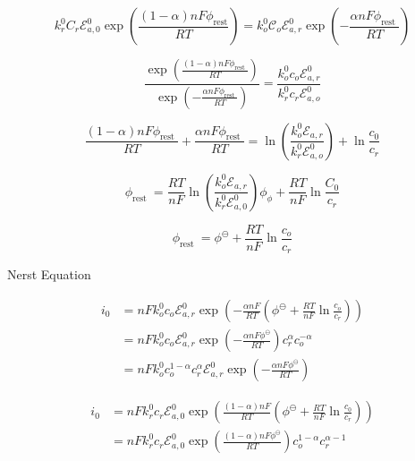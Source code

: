 \documentclass[lettersize,journal]{IEEEtran}
\begin{document}
\begin{equation}
  k_{r}^{0} C_{r} \mathscr{E}_{a, 0}^{0} \exp \left(\frac{(1-\alpha) n F \phi_{\text {rest}}}{R T}\right) =k_{o}^{0} \mathcal{C}_{o} \mathscr{E}_{a, r}^{0} \exp \left(-\frac{\alpha n F \phi_{\text {rest }}}{R T}\right)
\end{equation}


\begin{equation}
  \frac{\exp \left(\frac{(1-\alpha) n F \phi_{\text {rest }}}{R T}\right)}{\exp \left(-\frac{\alpha n F \phi_{\text {rest }}}{R T}\right)} =\frac{k_{o}^{0} c_{o} \mathscr{E}_{a, r}^{0}}{k_{r}^{0} c_{r} \mathscr{E}_{a, o}^{0}}
\end{equation}


\begin{equation}
  \frac{(1-\alpha) n F \phi_{\text {rest }}}{R T}+\frac{\alpha n F \phi_{\text {rest }}}{R T} =\ln \left(\frac{k_{o}^{0} \mathscr{E}_{a, r}}{k_{r}^{0} \mathscr{E}_{a, o}^{0}}\right)+\ln \frac{c_{0}}{c_{r}}
\end{equation}


\begin{equation}
  \phi_{\text {rest }} =\frac{R T}{n F} \ln \left(\frac{k_{o}^{0} \mathscr{E}_{a, r}}{k_{r}^{0} \mathscr{E}_{a, 0}^{0}}\right){\phi_{\phi}+\frac{R T}{n F} \ln \frac{C_{0}}{c_{r}}}
\end{equation}

\begin{equation}
\phi_{\text {rest }} =\phi^{\ominus}+\frac{R T}{n F} \ln \frac{c_{o}}{c_{r}}
\end{equation}

\noindent Nerst Equation

\begin{equation}
\begin{aligned}
i_{0} &=n F k_{o}^{0} c_{o} \mathscr{E}_{a, r}^{0} \exp \left(-\frac{\alpha n F}{R T}\left(\phi^{\ominus}+\frac{R T}{n F} \ln \frac{c_{o}}{c_{r}}\right)\right) \\
&=n F k_{o}^{0} c_{o} \mathscr{E}_{a, r}^{0} \exp \left(-\frac{\alpha n F \phi^{\ominus}}{R T}\right) c_{r}^{\alpha} c_{o}^{-\alpha} \\
&=n F k_{o}^{0} c_{o}^{1-\alpha} c_{r}^{\alpha} \mathscr{E}_{a, r}^{0} \exp \left(-\frac{\alpha n F \phi^{\ominus}}{R T}\right)
\end{aligned}
\end{equation}

\begin{equation}
\begin{aligned}
i_{0} &=n F k_{r}^{0} c_{r} \mathscr{E}_{a, 0}^{0} \exp \left(\frac{(1-\alpha) n F}{R T}\left(\phi^{\ominus}+\frac{R T}{n F} \ln \frac{c_{0}}{c_{r}}\right)\right) \\
&=n F k_{r}^{0} c_{r} \mathscr{E}_{a, 0}^{0} \exp \left(\frac{(1-\alpha) n F \phi^{\ominus}}{R T}\right) c_{o}^{1-\alpha} c_{r}^{\alpha-1}
\end{aligned}
\end{equation}
\end{document}
